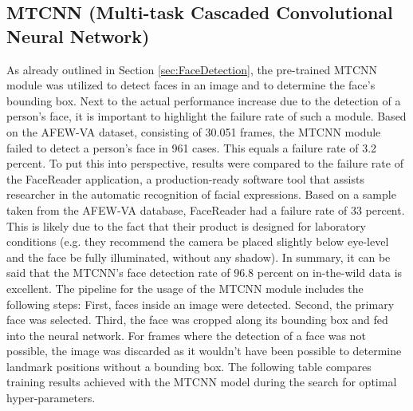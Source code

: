 \subsection{MTCNN (Multi-task Cascaded Convolutional Neural Network)}
As already outlined in Section \ref{sec:FaceDetection}, the pre-trained MTCNN module was utilized to detect faces in an image and to determine the face's bounding box. 
\newline\newline
Next to the actual performance increase due to the detection of a person's face, it is important to highlight the failure rate of such a module. Based on the AFEW-VA dataset, consisting of 30.051 frames, the MTCNN module failed to detect a person's face in 961 cases. This equals a failure rate of 3.2 percent. 
\newline\newline
To put this into perspective, results were compared to the failure rate of the FaceReader \citep{Noldus:2020:Facereader} application, a production-ready software tool that assists researcher in the automatic recognition of facial expressions. Based on a sample taken from the AFEW-VA database, FaceReader had a failure rate of 33 percent. This is likely due to the fact that their product is designed for laboratory conditions (e.g. they recommend the camera be placed slightly below eye-level and the face be fully illuminated, without any shadow). In summary, it can be said that the MTCNN's face detection rate of 96.8 percent on in-the-wild data is excellent.
\newline\newline
The pipeline for the usage of the MTCNN module includes the following steps: First, faces inside an image were detected. Second, the primary face was selected. Third, the face was cropped along its bounding box and fed into the neural network. For frames where the detection of a face was not possible, the image was discarded as it wouldn't have been possible to determine landmark positions without a bounding box. 
\newline\newline
The following table compares training results achieved with the MTCNN model during the search for optimal hyper-parameters.

